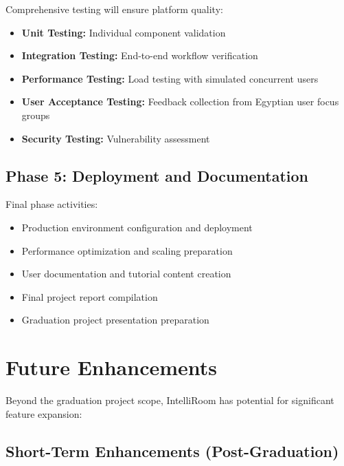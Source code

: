 Comprehensive testing will ensure platform quality:
\begin{itemize}
    \item \textbf{Unit Testing:} Individual component validation
    \item \textbf{Integration Testing:} End-to-end workflow verification
    \item \textbf{Performance Testing:} Load testing with simulated concurrent users
    \item \textbf{User Acceptance Testing:} Feedback collection from Egyptian user focus groups
    \item \textbf{Security Testing:} Vulnerability assessment
\end{itemize}

\subsection{Phase 5: Deployment and Documentation}

Final phase activities:
\begin{itemize}
    \item Production environment configuration and deployment
    \item Performance optimization and scaling preparation
    \item User documentation and tutorial content creation
    \item Final project report compilation
    \item Graduation project presentation preparation
\end{itemize}

\section{Future Enhancements}
\label{sec:future}

Beyond the graduation project scope, IntelliRoom has potential for significant feature expansion:

\subsection{Short-Term Enhancements (Post-Graduation)}

